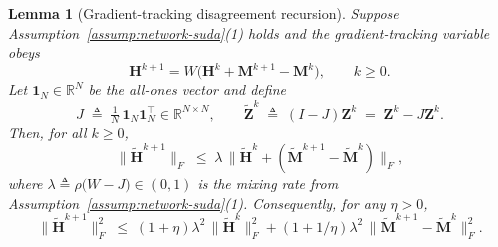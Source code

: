 \documentclass{article}
\newtheorem{lemma}{Lemma}
\begin{document}
\begin{lemma}[Gradient-tracking disagreement recursion]
\label{lem:sudamuon-gt-disagreement}
Suppose Assumption~\ref{assump:network-suda}(1) holds and the gradient-tracking variable obeys
\[
    \mathbf{H}^{k+1}=W\bigl(\mathbf{H}^k+\mathbf{M}^{k+1}-\mathbf{M}^k\bigr),\qquad k\ge 0.
\]
Let $\mathbf{1}_N\in\mathbb{R}^N$ be the all-ones vector and define
\[
    J \;\triangleq\; \tfrac{1}{N}\,\mathbf{1}_N\mathbf{1}_N^\top\in\mathbb{R}^{N\times N},\qquad
    \tilde{\mathbf{Z}}^k \;\triangleq\; (I-J)\mathbf{Z}^k \;=\; \mathbf{Z}^k-J\mathbf{Z}^k.
\]
Then, for all $k\ge 0$,
\[
    \|\tilde{\mathbf{H}}^{k+1}\|_F
    \;\le\;
    \lambda\,\bigl\|\tilde{\mathbf{H}}^{k} + (\tilde{\mathbf{M}}^{k+1}-\tilde{\mathbf{M}}^{k})\bigr\|_F,
\]
where $\lambda\triangleq \rho\bigl(W-J\bigr)\in(0,1)$ is the mixing rate from Assumption~\ref{assump:network-suda}(1).
Consequently, for any $\eta>0$,
\[
    \|\tilde{\mathbf{H}}^{k+1}\|_F^2
    \;\le\; (1+\eta)\lambda^2\,\|\tilde{\mathbf{H}}^{k}\|_F^2
    + (1+1/\eta)\lambda^2\,\|\tilde{\mathbf{M}}^{k+1}-\tilde{\mathbf{M}}^{k}\|_F^2.
\]
\end{lemma}
\end{document}
